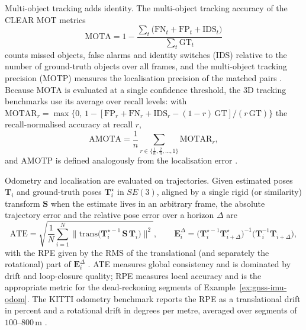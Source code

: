 Multi-object tracking adds identity. The multi-object tracking accuracy of the CLEAR MOT metrics
\begin{equation}
\mathrm{MOTA}=1-\frac{\sum_{t}\big(\mathrm{FN}_{t}+\mathrm{FP}_{t}+\mathrm{IDS}_{t}\big)}{\sum_{t}\mathrm{GT}_{t}}
\label{eq:mota}
\end{equation}
counts missed objects, false alarms and identity switches (IDS) relative to the number of ground-truth objects over all frames, and the multi-object tracking precision (MOTP) measures the localisation precision of the matched pairs \cite{bernardin2008_clearmot}. Because MOTA is evaluated at a single confidence threshold, the 3D tracking benchmarks use its average over recall levels: with $\mathrm{MOTAR}_{r}=\max\{0,\,1-[\mathrm{FP}_{r}+\mathrm{FN}_{r}+\mathrm{IDS}_{r}-(1-r)\,\mathrm{GT}]/(r\,\mathrm{GT})\}$ the recall-normalised accuracy at recall $r$,
\begin{equation}
\mathrm{AMOTA}=\frac{1}{n}\sum_{r\in\{\frac{1}{n},\frac{2}{n},\dots,1\}}\mathrm{MOTAR}_{r},
\label{eq:amota}
\end{equation}
and AMOTP is defined analogously from the localisation error \cite{weng2020_ab3dmot,caesar2020_nuscenes}.

Odometry and localisation are evaluated on trajectories. Given estimated poses $\mathbf{T}_{i}$ and ground-truth poses $\mathbf{T}_{i}^{\star}$ in $SE(3)$, aligned by a single rigid (or similarity) transform $\mathbf{S}$ when the estimate lives in an arbitrary frame, the absolute trajectory error and the relative pose error over a horizon $\Delta$ are
\begin{equation}
\mathrm{ATE}=\sqrt{\frac{1}{N}\sum_{i=1}^{N}\big\|\mathrm{trans}\big(\mathbf{T}_{i}^{\star-1}\,\mathbf{S}\,\mathbf{T}_{i}\big)\big\|^{2}},
\qquad
\mathbf{E}_{i}^{\Delta}=\big(\mathbf{T}_{i}^{\star-1}\mathbf{T}_{i+\Delta}^{\star}\big)^{-1}\big(\mathbf{T}_{i}^{-1}\mathbf{T}_{i+\Delta}\big),
\label{eq:ate-rpe}
\end{equation}
with the RPE given by the RMS of the translational (and separately the rotational) part of $\mathbf{E}_{i}^{\Delta}$ \cite{sturm2012_rgbd}. ATE measures global consistency and is dominated by drift and loop-closure quality; RPE measures local accuracy and is the appropriate metric for the dead-reckoning segments of Example~\ref{ex:gnss-imu-odom}. The KITTI odometry benchmark reports the RPE as a translational drift in percent and a rotational drift in degrees per metre, averaged over segments of $100$--$800$\,m \cite{geiger2013_kitti}.

